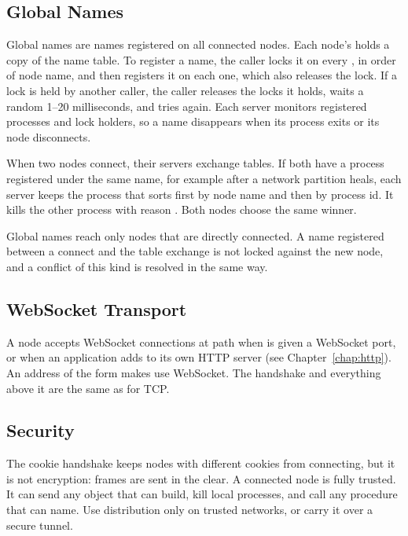 \subsection {Global Names}\label{sec:dist-global-names}

Global names are names registered on all connected
nodes. Each node's  holds a copy of the name
table. To register a name, the caller locks it on every
, in order of node name, and then registers it
on each one, which also releases the lock. If a lock is held by another
caller, the caller releases the locks it holds, waits a random 1--20
milliseconds, and tries again. Each server monitors registered
processes and lock holders, so a name disappears when its process exits
or its node disconnects.

When two nodes connect, their servers exchange tables. If both have a
process registered under the same name, for example after a network
partition heals, each server keeps the process that sorts first by
node name and then by process id. It kills the other process with
reason . Both nodes choose the
same winner.

Global names reach only nodes that are directly connected. A name
registered between a connect and the table exchange is not locked
against the new node, and a conflict of this kind is resolved in the
same way.

\subsection {WebSocket Transport}

A node accepts WebSocket connections at path  when
 is given a WebSocket port, or when an
application adds  to its own HTTP server (see
Chapter~\ref{chap:http}). An address of the form
 makes 
use WebSocket. The handshake and everything above it are the same as
for TCP.

\subsection {Security}

The cookie handshake keeps nodes with different cookies from
connecting, but it is not encryption: frames are sent in the clear. A
connected node is fully trusted. It can send any object that
 can build, kill local processes, and call any
procedure that  can name. Use distribution only on
trusted networks, or carry it over a secure tunnel.

